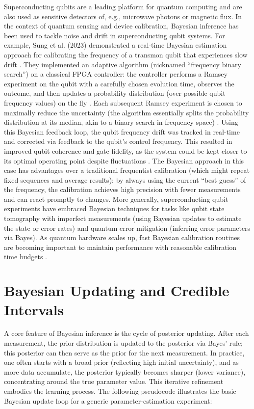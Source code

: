 Superconducting qubits are a leading platform for quantum computing
and are also used as sensitive detectors of, e.g., microwave photons
or magnetic flux. In the context of quantum sensing and device
calibration, Bayesian inference has been used to tackle noise and
drift in superconducting qubit systems. For example, Sung et
al. (2023) demonstrated a real-time Bayesian estimation approach for
calibrating the frequency of a transmon qubit that experiences slow
drift . They implemented an adaptive algorithm (nicknamed “frequency
binary search”) on a classical FPGA controller: the controller
performs a Ramsey experiment on the qubit with a carefully chosen
evolution time, observes the outcome, and then updates a probability
distribution (over possible qubit frequency values) on the fly . Each
subsequent Ramsey experiment is chosen to maximally reduce the
uncertainty (the algorithm essentially splits the probability
distribution at its median, akin to a binary search in frequency
space) . Using this Bayesian feedback loop, the qubit frequency drift
was tracked in real-time and corrected via feedback to the qubit’s
control frequency. This resulted in improved qubit coherence and gate
fidelity, as the system could be kept closer to its optimal operating
point despite fluctuations . The Bayesian approach in this case has
advantages over a traditional frequentist calibration (which might
repeat fixed sequences and average results): by always using the
current “best guess” of the frequency, the calibration achieves high
precision with fewer measurements and can react promptly to
changes. More generally, superconducting qubit experiments have
embraced Bayesian techniques for tasks like qubit state tomography
with imperfect measurements (using Bayesian updates to estimate the
state or error rates) and quantum error mitigation (inferring error
parameters via Bayes). As quantum hardware scales up, fast Bayesian
calibration routines are becoming important to maintain performance
with reasonable calibration time budgets .



\section{Bayesian Updating and Credible Intervals}

A core feature of Bayesian inference is the cycle of posterior
updating. After each measurement, the prior distribution is updated to
the posterior via Bayes’ rule; this posterior can then serve as the
prior for the next measurement. In practice, one often starts with a
broad prior (reflecting high initial uncertainty), and as more data
accumulate, the posterior typically becomes sharper (lower variance),
concentrating around the true parameter value. This iterative
refinement embodies the learning process. The following pseudocode
illustrates the basic Bayesian update loop for a generic
parameter-estimation experiment:



